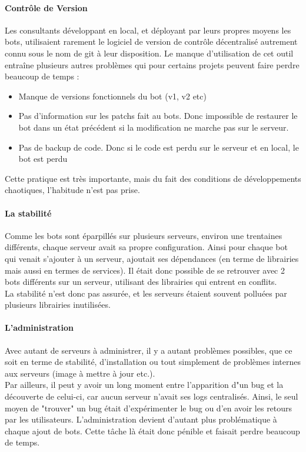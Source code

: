 \documentclass{article} %
\begin{document}
\paragraph{Contrôle de Version}
Les consultants développant en local, et déployant par leurs propres moyens les bots,  utilisaient rarement le logiciel de version de contrôle décentralisé autrement connu sous le nom de git à leur disposition.
Le manque d'utilisation de cet outil entraîne plusieurs autres problèmes qui pour certains projets peuvent faire perdre beaucoup de temps :
\begin{itemize}
	\item Manque de versions fonctionnels du bot (v1, v2 etc)
	\item Pas d'information sur les patchs fait au bots. Donc impossible de restaurer le bot dans un état précédent si la modification ne marche pas sur le serveur.
	\item Pas de backup de code. Donc si le code est perdu sur le serveur et en local, le bot est perdu
\end{itemize}
Cette pratique est très importante, mais du fait des conditions de développements chaotiques, l'habitude n'est pas prise.

\paragraph{La stabilité}
Comme les bots sont éparpillés sur plusieurs serveurs, environ une trentaines différents, chaque serveur avait sa propre configuration. Ainsi pour chaque bot qui venait s'ajouter à un serveur, ajoutait ses dépendances (en terme de librairies mais aussi en termes de services). Il était donc possible de se retrouver avec 2 bots différents sur un serveur, utilisant des librairies qui entrent en conflits.\\
La stabilité n'est donc pas assurée, et les serveurs étaient souvent polluées par plusieurs librairies inutilisées.

\paragraph{L'administration}
Avec autant de serveurs à administrer, il y a autant problèmes possibles, que ce soit en terme de stabilité, d'installation ou tout simplement de problèmes internes aux serveurs (image à mettre à jour etc.).\\
Par ailleurs, il peut y avoir un long moment entre l'apparition d"un bug et la découverte de celui-ci, car aucun serveur n'avait ses logs centralisés. Ainsi, le seul moyen de "trouver" un bug était d'expérimenter le bug ou d'en avoir les retours par les utilisateurs. L'administration devient d'autant plus problématique à chaque ajout de bots. Cette tâche là était donc pénible et faisait perdre beaucoup de temps.
\end{document}
